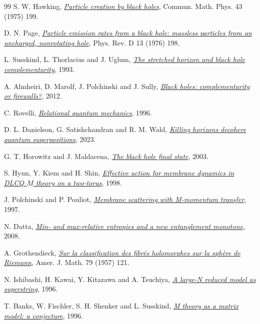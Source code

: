 \begin{thebibliography}{99}
\small
{} S. W. Hawking, \href{https://doi.org/10.1007/BF02345020}{\emph{Particle creation by black holes}}, Commun. Math. Phys. 43 (1975) 199.

 D. N. Page, \href{https://doi.org/10.1103/PhysRevD.13.198}{\emph{Particle emission rates from a black hole: massless particles from an uncharged, nonrotating hole}}, Phys. Rev. D 13 (1976) 198.

 L. Susskind, L. Thorlacius and J. Uglum, \href{https://arxiv.org/abs/hep-th/9306069}{\emph{The stretched horizon and black hole complementarity}}, 1993.

 A. Almheiri, D. Marolf, J. Polchinski and J. Sully, \href{https://arxiv.org/abs/1207.3123}{\emph{Black holes: complementarity or firewalls?}}, 2012.

 C. Rovelli, \href{https://arxiv.org/abs/quant-ph/9609002}{\emph{Relational quantum mechanics}}, 1996.

 D. L. Danielson, G. Satishchandran and R. M. Wald, \href{https://arxiv.org/abs/2301.00026}{\emph{Killing horizons decohere quantum superpositions}}, 2023.

 G. T. Horowitz and J. Maldacena, \href{https://arxiv.org/abs/hep-th/0310281}{\emph{The black hole final state}}, 2003.

 S. Hyun, Y. Kiem and H. Shin, \href{https://arxiv.org/abs/hep-th/9808183}{\emph{Effective action for membrane dynamics in DLCQ \(M\) theory on a two-torus}}, 1998.

 J. Polchinski and P. Pouliot, \href{https://arxiv.org/abs/hep-th/9704029}{\emph{Membrane scattering with M-momentum transfer}}, 1997.

 N. Datta, \href{https://arxiv.org/abs/0803.2770}{\emph{Min- and max-relative entropies and a new entanglement monotone}}, 2008.

 A. Grothendieck, \href{https://doi.org/10.2307/2372388}{\emph{Sur la classification des fibr\'es holomorphes sur la sph\`ere de Riemann}}, Amer. J. Math. 79 (1957) 121.

 N. Ishibashi, H. Kawai, Y. Kitazawa and A. Tsuchiya, \href{https://arxiv.org/abs/hep-th/9612115}{\emph{A large-N reduced model as superstring}}, 1996.

 T. Banks, W. Fischler, S. H. Shenker and L. Susskind, \href{https://arxiv.org/abs/hep-th/9610043}{\emph{M theory as a matrix model: a conjecture}}, 1996.


\end{thebibliography}

